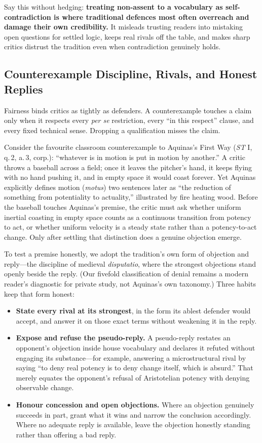 Say this without hedging: \textbf{treating non-assent to a vocabulary as self-contradiction is where traditional defences most often overreach and damage their own credibility.} It misleads trusting readers into mistaking open questions for settled logic, keeps real rivals off the table, and makes sharp critics distrust the tradition even when contradiction genuinely holds.

\subsection{Counterexample Discipline, Rivals, and Honest Replies}

Fairness binds critics as tightly as defenders. A counterexample touches a claim only when it respects every \emph{per se} restriction, every ``in this respect'' clause, and every fixed technical sense. Dropping a qualification misses the claim.

Consider the favourite classroom counterexample to Aquinas's First Way (\emph{ST} I, q.\,2, a.\,3, corp.): ``whatever is in motion is put in motion by another.'' A critic throws a baseball across a field; once it leaves the pitcher's hand, it keeps flying with no hand pushing it, and in empty space it would coast forever. Yet Aquinas explicitly defines motion (\emph{motus}) two sentences later as ``the reduction of something from potentiality to actuality,'' illustrated by fire heating wood. Before the baseball touches Aquinas's premise, the critic must ask whether uniform inertial coasting in empty space counts as a continuous transition from potency to act, or whether uniform velocity is a steady state rather than a potency-to-act change. Only after settling that distinction does a genuine objection emerge.

To test a premise honestly, we adopt the tradition's own form of objection and reply---the discipline of medieval \emph{disputatio}, where the strongest objections stand openly beside the reply. (Our fivefold classification of denial remains a modern reader's diagnostic for private study, not Aquinas's own taxonomy.) Three habits keep that form honest:

\begin{itemize}
\item \textbf{State every rival at its strongest}, in the form its ablest defender would accept, and answer it on those exact terms without weakening it in the reply.
\item \textbf{Expose and refuse the pseudo-reply.} A pseudo-reply restates an opponent's objection inside house vocabulary and declares it refuted without engaging its substance---for example, answering a microstructural rival by saying ``to deny real potency is to deny change itself, which is absurd.'' That merely equates the opponent's refusal of Aristotelian potency with denying observable change.
\item \textbf{Honour concession and open objections.} Where an objection genuinely succeeds in part, grant what it wins and narrow the conclusion accordingly. Where no adequate reply is available, leave the objection honestly standing rather than offering a bad reply.
\end{itemize}

